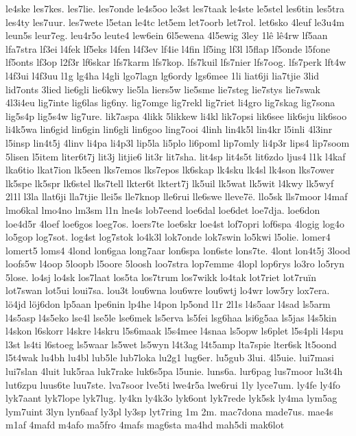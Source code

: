 le4ske
les7kes.
les7lie.
les7onde
le4s5oo
le3st
les7taak
le4ste
le5stel
les6tin
les5tra
les4ty
les7uur.
les7wete
l5etan
le4tc
let5em
let7oorb
let7rol.
let6sko
4leuf
le3u4m
leun5s
leur7eg.
leu4r5o
leute4
lew6ein
6l5ewena
4l5ewig
3ley
1lê
lê4rw
lf5aan
lfa7stra
lf3ei
l4fek
lf5eks
l4fen
l4f3ev
lf4ie
l4fin
lf5ing
lf3l
l5flap
lf5onde
l5fone
lf5onts
lf3op
l2f3r
lf6skar
lfs7karm
lfs7kop.
lfs7kuil
lfs7nier
lfs7oog.
lfs7perk
lft4w
l4f3ui
l4f3uu
l1g
lg4ha
l4gli
lgo7lagn
lg6ordy
lgs6mee
1li
liat6ji
lia7tjie
3lid
lid7onts
3lied
lie6gli
lie6kwy
lie5la
liers5w
lie5sme
lie7steg
lie7stys
lie7swak
4l3i4eu
lig7inte
lig6las
lig6ny.
lig7omge
lig7rekl
lig7riet
li4gro
lig7skag
lig7sona
lig5s4p
lig5s4w
lig7ure.
lik7aspa
4likk
5likkew
li4kl
lik7opsi
lik6see
lik6sju
lik6soo
li4k5wa
lin6gid
lin6gin
lin6gli
lin6goo
ling7ooi
4linh
lin4k5l
lin4kr
l5inli
4l3inr
l5insp
lin4t5j
4linv
li4pa
li4p3l
lip5la
li5plo
li6poml
lip7omly
li4p3r
lips4
lip7soom
5lisen
l5item
liter6t7j
lit3j
litjie6
lit3r
lit7sha.
lit4sp
lit4s5t
lit6zdo
ljus4
l1k
l4kaf
lka6tio
lkat7ion
lk5een
lks7emos
lks7epos
lk6skap
lk4sku
lk4sl
lk4son
lks7ower
lk5spe
lk5spr
lk6stel
lks7tell
lkter6t
lktert7j
lk5uil
lk5wat
lk5wit
l4kwy
lk5wyf
2l1l
l3la
llat6ji
lla7tjie
llei5s
lle7knop
lle6rui
lle6swe
lleve7ë.
llo5sk
lls7moor
l4maf
lmo6kal
lmo4no
lm3sm
l1n
lne4s
lob7eend
loe6dal
loe6det
loe7dja.
loe6don
loe4d5r
4loef
loe6gos
loeg7os.
loers7te
loe6skr
loe4st
lof7opri
lof6spa
4logig
log4o
lo5gop
log7sot.
log4st
log7stok
lo4k3l
lok7onde
lok7swin
lo5kwi
l5olie.
lomer4
lomert5
loms4
4lond
lon6gaa
long7aar
lon6spa
lon6ste
lons7te.
4lont
lon4t5j
3lood
loofs5w
l4oop
5loopb
l5oore
5loosh
loo7stra
lop7emme
4lopl
lop6rys
lo3ro
lo5ryn
5lose.
lo4sj
lo4sk
los7laat
los5ta
los7trum
los7wikk
lo4tak
lot7riet
lot7ruïn
lot7swan
lot5ui
loui7sa.
lou3t
lou6wna
lou6wre
lou6wtj
lo4wr
low5ry
lox7era.
lö4jd
löj6don
lp5aan
lpe6nin
lp4he
l4pon
lp5ond
l1r
2l1s
l4s5aar
l4sad
ls5arm
l4s5asp
l4s5eko
lse4l
lse5le
lse6mek
ls5erva
ls5fei
lsg6haa
lsi6g5aa
ls5jas
l4s5kin
l4skon
l6skorr
l4skre
l4skru
l5s6maak
l5s4mee
l4snaa
ls5opw
ls6plet
l5s4pli
l4spu
l3st
ls4ti
l6stoeg
ls5waar
ls5wet
ls5wyn
l4t3ag
l4t5amp
lta7spie
lter6sk
lt5oond
l5t4wak
lu4bh
lu4bl
lub5le
lub7loka
lu2g1
lug6er.
lu5gub
3lui.
4l5uie.
lui7masi
lui7slan
4luit
luk5raa
luk7rake
luk6s5pa
l5unie.
luns6a.
lur6pag
lus7moor
lu3t4h
lut6zpu
luus6te
luu7ste.
lva7soor
lve5ti
lwe4r5a
lwe6rui
1ly
lyce7um.
ly4fe
ly4fo
lyk7aant
lyk7lope
lyk7lug.
ly4kn
ly4k3o
lyk6ont
lyk7rede
lyk5sk
ly4ma
lym5ag
lym7uint
3lyn
lyn6aaf
ly3pl
ly3sp
lyt7ring
1m
2m.
mac7dona
made7us.
mae4s
m1af
4mafd
m4afo
ma5fro
4mafs
mag6sta
ma4hd
mah5di
mak6lot
